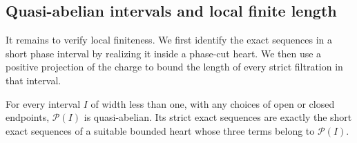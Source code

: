 \subsection{Quasi-abelian intervals and local finite length}

It remains to verify local finiteness. We first identify the exact sequences
in a short phase interval by realizing it inside a phase-cut heart. We then
use a positive projection of the charge to bound the length of every strict
filtration in that interval.

\begin{lemma}
\label{lem:interval-quasiabelian}
For every interval $I$ of width less than one, with any choices of open
or closed endpoints, $\mathcal P(I)$ is quasi-abelian.  Its strict exact
sequences are exactly the short exact sequences of a suitable bounded
heart whose three terms belong to $\mathcal P(I)$.
\end{lemma}

